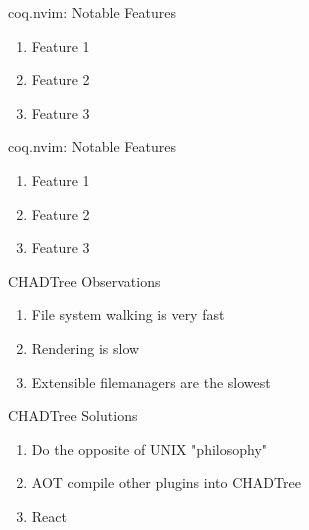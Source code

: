 \documentclass{beamer}
\begin{document}
\begin{frame}{coq.nvim: Notable Features}


	\begin{enumerate}

		\item Feature 1

		\item Feature 2

		\item Feature 3

	\end{enumerate}


\end{frame}


\begin{frame}{coq.nvim: Notable Features}


	\begin{enumerate}

		\item Feature 1

		\item Feature 2

		\item Feature 3

	\end{enumerate}


\end{frame}



\begin{frame}{CHADTree Observations}


	\begin{enumerate}

		\item File system walking is very fast

		\item Rendering is slow

		\item Extensible filemanagers are the slowest

	\end{enumerate}


\end{frame}


\begin{frame}{CHADTree Solutions}


	\begin{enumerate}

		\item Do the opposite of UNIX "philosophy"


		\item AOT compile other plugins into CHADTree

		\item React


	\end{enumerate}


\end{frame}
\end{document}
